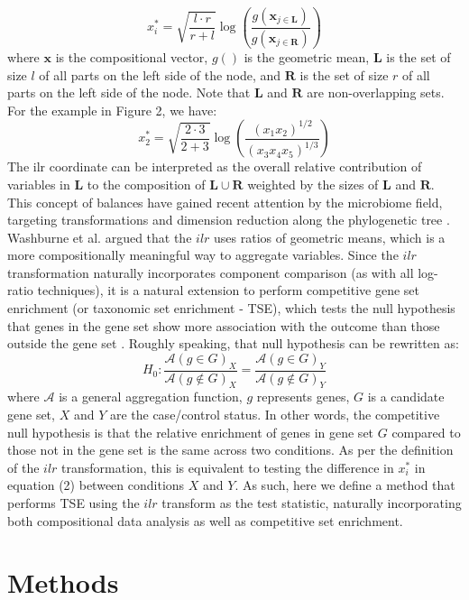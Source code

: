 \documentclass{article}
\begin{document}
\begin{equation}
    x_i^* = \sqrt{\frac{l \cdot r}{r + l}} \log \left(\frac{g(\bm{x}_{j \in \bm{L}})}{g(\bm{x}_{j \in \bm{R}})}\right)
\end{equation}
where $\bm{x}$ is the compositional vector, $g()$ is the geometric mean, $\bm{L}$ is the set of size $l$ of all parts on the left side of the node, and $\bm R$ is the set of size $r$ of all parts on the left side of the node. Note that $\bm L$ and $\bm R$ are non-overlapping sets. For the example in Figure 2, we have: 
\[ x_2^* = \sqrt{\frac{2 \cdot 3}{2 + 3}} \log \left( \frac{(x_1x_2)^{1/2}}{(x_3x_4x_5)^{1/3}}\right) \]
The ilr coordinate can be interpreted as the overall relative contribution of variables in $\bm L$ to the composition of $\bm L \cup \bm R$ weighted by the sizes of $\bm L$ and $\bm R$. This concept of balances have gained recent attention by the microbiome field, targeting transformations and dimension reduction along the phylogenetic tree \cite{washburne2017a, silverman2017a}. Washburne et al. \cite{washburne2017a} argued that the $ilr$ uses ratios of geometric means, which is a more compositionally meaningful way to aggregate variables. Since the $ilr$ transformation naturally incorporates component comparison (as with all log-ratio techniques), it is a natural extension to perform competitive gene set enrichment (or taxonomic set enrichment - TSE), which tests the null hypothesis that genes in the gene set show more association with the outcome than those outside the gene set \cite{tian2005}. Roughly speaking, that null hypothesis can be rewritten as:
\begin{equation}
H_0 : \frac{\mathcal{A}(g \in G)_X}{\mathcal{A}(g \notin G)_X} = \frac{\mathcal{A}(g \in G)_Y}{\mathcal{A}(g \notin G)_Y}
\end{equation}
where $\mathcal{A}$ is a general aggregation function, $g$ represents genes, $G$ is a candidate gene set, $X$ and $Y$ are the case/control status. In other words, the competitive null hypothesis is that the relative enrichment of genes in gene set $G$ compared to those not in the gene set is the same across two conditions. As per the definition of the $ilr$ transformation, this is equivalent to testing the difference in $x^*_i$ in equation (2) between conditions $X$ and $Y$. As such, here we define a method that performs TSE using the $ilr$ transform as the test statistic, naturally incorporating both compositional data analysis as well as competitive set enrichment.     

\section{Methods}
\end{document}
